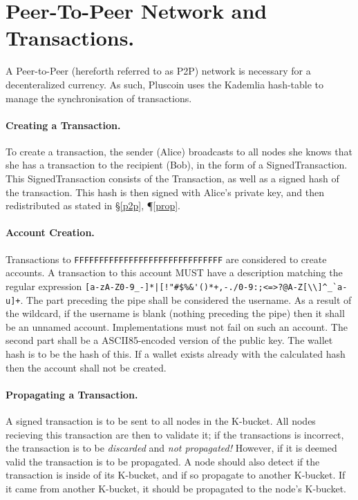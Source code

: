 \documentclass{article}
\begin{document}
\label{p2p}
\section{Peer-To-Peer Network and Transactions.}
A Peer-to-Peer (hereforth referred to as P2P) network is necessary for a
decenteralized currency. As such, Pluscoin uses the Kademlia hash-table to
manage the synchronisation of transactions.

\paragraph{Creating a Transaction.} To create a transaction, the sender (Alice)
broadcasts to all nodes she knows that she has a transaction to the recipient
(Bob), in the form of a SignedTransaction. This SignedTransaction consists of
the Transaction, as well as a signed hash of the transaction. This hash is
then signed with Alice's private key, and then redistributed as stated in
\S\ref{p2p}, \P\ref{prop}.

\paragraph{Account Creation.} Transactions to 
{\texttt{F\-F\-F\-F\-F\-F\-F\-F\-F\-F\-F\-F\-F\-F\-F\-F\-F\-F\-F\-F\-F\-F\-F\-F\-F\-F\-F\-F\-F\-F}}
are considered to create accounts. A transaction to this account MUST have a
description matching the regular expression \verb~[a-zA-Z0-9_-]*|[!"#$%&'()*+,-./0-9:;<=>?@A-Z[\\]^_`a-u]+~.
The part preceding the pipe shall be considered the username. As a result of
the wildcard, if the username is blank (nothing preceding the pipe) then it
shall be an unnamed account. Implementations must not fail on such an account.
The second part shall be a ASCII85-encoded version of the public key. The
wallet hash is to be the hash of this. If a wallet exists already with the
calculated hash then the account shall not be created.

\label{prop}
\paragraph{Propagating a Transaction.} A signed transaction is to be sent to all
nodes in the K-bucket. All nodes recieving this transaction are then to validate
it; if the transactions is incorrect, the transaction is to be {\it{discarded}}
and {\it{not propagated!}} However, if it is deemed valid the transaction is to
be propagated. A node should also detect if the transaction is inside of its
K-bucket, and if so propagate to another K-bucket.  If it came from another
K-bucket, it should be propagated to the node's K-bucket.
\end{document}
